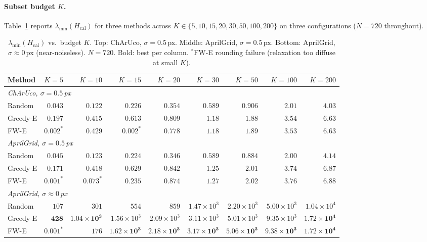 \documentclass[11pt]{article}
\begin{document}
\paragraph{Subset budget $K$.}
Table~\ref{tab:k_sweep} reports $\lambda_{\min}(H_{\mathrm{cal}})$ for three
methods across $K\in\{5,10,15,20,30,50,100,200\}$ on three
configurations ($N{=}720$ throughout).

\begin{table}[h]
\centering
\small
\caption{$\lambda_{\min}(H_{\mathrm{cal}})$ vs.\ budget $K$.
Top: ChArUco, $\sigma{=}0.5$\,px. Middle: AprilGrid, $\sigma{=}0.5$\,px.
Bottom: AprilGrid, $\sigma{\approx}0$\,px (near-noiseless). $N{=}720$.
Bold: best per column.
${}^*$FW-E rounding failure (relaxation too diffuse at small $K$).}
\label{tab:k_sweep}
\setlength{\tabcolsep}{4pt}
\begin{tabular}{lrrrrrrrr}
\toprule
Method & $K{=}5$ & $K{=}10$ & $K{=}15$ & $K{=}20$ & $K{=}30$ & $K{=}50$ & $K{=}100$ & $K{=}200$ \\
\midrule
\multicolumn{9}{l}{\textit{ChArUco, $\sigma=0.5$\,px}} \\[2pt]
Random   & $0.043$ & $0.122$ & $0.226$ & $0.354$ & $0.589$ & $0.906$ & $2.01$ & $4.03$ \\
Greedy-E & $\mathbf{0.197}$ & $0.415$ & $\mathbf{0.613}$ & $\mathbf{0.809}$ & $\mathbf{1.18}$ & $1.88$ & $\mathbf{3.54}$ & $\mathbf{6.63}$ \\
FW-E     & $0.002^*$ & $\mathbf{0.429}$ & $0.002^*$ & $0.778$ & $\mathbf{1.18}$ & $\mathbf{1.89}$ & $3.53$ & $\mathbf{6.63}$ \\
\midrule
\multicolumn{9}{l}{\textit{AprilGrid, $\sigma=0.5$\,px}} \\[2pt]
Random   & $0.045$ & $0.123$ & $0.224$ & $0.346$ & $0.589$ & $0.884$ & $2.00$ & $4.14$ \\
Greedy-E & $\mathbf{0.171}$ & $\mathbf{0.418}$ & $\mathbf{0.629}$ & $0.842$ & $1.25$ & $2.01$ & $3.74$ & $6.87$ \\
FW-E     & $0.001^*$ & $0.073^*$ & $0.235$ & $\mathbf{0.874}$ & $\mathbf{1.27}$ & $\mathbf{2.02}$ & $\mathbf{3.76}$ & $\mathbf{6.88}$ \\
\midrule
\multicolumn{9}{l}{\textit{AprilGrid, $\sigma{\approx}0$\,px}} \\[2pt]
Random   & $107$ & $301$ & $554$ & $859$ & $1.47\!\times\!10^{3}$ & $2.20\!\times\!10^{3}$ & $5.00\!\times\!10^{3}$ & $1.04\!\times\!10^{4}$ \\
Greedy-E & $\mathbf{428}$ & $\mathbf{1.04\!\times\!10^{3}}$ & $1.56\!\times\!10^{3}$ & $2.09\!\times\!10^{3}$ & $3.11\!\times\!10^{3}$ & $5.01\!\times\!10^{3}$ & $9.35\!\times\!10^{3}$ & $\mathbf{1.72\!\times\!10^{4}}$ \\
FW-E     & $0.001^*$ & $176$ & $\mathbf{1.62\!\times\!10^{3}}$ & $\mathbf{2.18\!\times\!10^{3}}$ & $\mathbf{3.17\!\times\!10^{3}}$ & $\mathbf{5.06\!\times\!10^{3}}$ & $\mathbf{9.38\!\times\!10^{3}}$ & $\mathbf{1.72\!\times\!10^{4}}$ \\
\bottomrule
\end{tabular}
\end{table}
\end{document}
